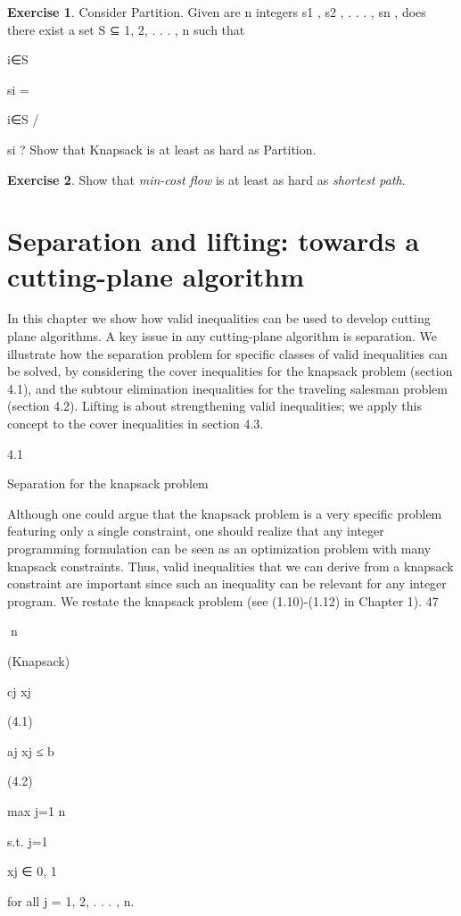 \documentclass[titlepage]{book}
\makeatletter
\newcommand{\concept}[1]{\toindex{#1}\indexlayout{#1}}
\newcommand{\indexlayout}[1]{\emph{#1}}
\newcommand\toindex{\@ifstar{\@dblarg{\@toindexs}}{\@toindex}}
\def\@toindexs[#1]#2{\index{#1@#2}}
\newcommand\@toindex[2][]{%
  \if\relax\detokenize{#1}\relax
    \begingroup
    \@splitword#2\@nil%
    \uppercase\expandafter{%
      \expandafter\def\expandafter\@initial\expandafter{\@first}}%
    \toks0=\expandafter{\@initial}%
    \toks2=\expandafter{\@rest}%
    \edef\x{\endgroup\noexpand\index{\the\toks0 \the\toks2 }}\x
  \else
    \index{#1}
  \fi
}
\def\@splitword#1#2\@nil{\def\@first{#1}\def\@rest{#2}}
\theoremstyle{plain}
\theoremstyle{definition}
\newtheorem{exercise}{Exercise}[chapter]
\theoremstyle{remark}
\makeatother
\begin{document}
\begin{exercise}
Consider Partition. Given are n integers s1 , s2 , . . . , sn , does there exist a set S ⊆ {1, 2, . . . , n}
such that

i∈S

si =

i∈S
/

si ? Show that Knapsack is at least as hard as Partition.
\end{exercise}
\begin{exercise}
Show that \concept{min-cost flow} is at least as hard as \concept{shortest path}.
\end{exercise}

\chapter{Separation and lifting: towards a cutting-plane algorithm}
In this chapter we show how valid inequalities can be used to develop cutting plane algorithms. A key
issue in any cutting-plane algorithm is separation. We illustrate how the separation problem for specific classes of valid inequalities can be solved, by considering the cover inequalities for the knapsack
problem (section 4.1), and the subtour elimination inequalities for the traveling salesman problem (section 4.2). Lifting is about strengthening valid inequalities; we apply this concept to the cover inequalities
in section 4.3.

4.1

Separation for the knapsack problem

Although one could argue that the knapsack problem is a very specific problem featuring only a single
constraint, one should realize that any integer programming formulation can be seen as an optimization
problem with many knapsack constraints. Thus, valid inequalities that we can derive from a knapsack
constraint are important since such an inequality can be relevant for any integer program.
We restate the knapsack problem (see (1.10)-(1.12) in Chapter 1).
47

n

(Knapsack)

cj xj

(4.1)

aj xj ≤ b

(4.2)

max
j=1
n

s.t.
j=1

xj ∈ {0, 1}

for all j = 1, 2, . . . , n.
\end{document}
